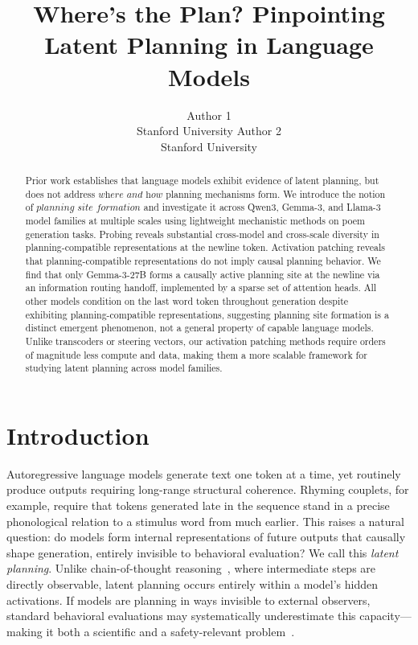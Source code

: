 \documentclass{article}
\title{Where's the Plan? Pinpointing Latent Planning in Language Models}
\author{Author 1 \\ Stanford University \And Author 2 \\ Stanford University}
\begin{document}
\ifcolmsubmission
\linenumbers
\fi

\maketitle

\begin{abstract}
    Prior work establishes that language models exhibit evidence of latent planning, but does not address $\textit{where and how}$ planning mechanisms form. We introduce the notion of $\textit{planning site formation}$ and investigate it across Qwen3, Gemma-3, and Llama-3 model families at multiple scales using lightweight mechanistic methods on poem generation tasks. Probing reveals substantial cross-model and cross-scale diversity in planning-compatible representations at the newline token. Activation patching reveals that planning-compatible representations do not imply causal planning behavior. We find that only Gemma-3-27B forms a causally active planning site at the newline via an information routing handoff, implemented by a sparse set of attention heads. All other models condition on the last word token throughout generation despite exhibiting planning-compatible representations, suggesting planning site formation is a distinct emergent phenomenon, not a general property of capable language models. Unlike transcoders or steering vectors, our activation patching methods require orders of magnitude less compute and data, making them a more scalable framework for studying latent planning across model families.
\end{abstract}


\section{Introduction}

Autoregressive language models generate text one token at a time, yet routinely produce outputs requiring long-range structural coherence. Rhyming couplets, for example, require that tokens generated late in the sequence stand in a precise phonological relation to a stimulus word from much earlier. This raises a natural question: do models form internal representations of future outputs that causally shape generation, entirely invisible to behavioral evaluation? We call this \textit{latent planning}. Unlike chain-of-thought reasoning~\citep{wei2022chain}, where intermediate steps are directly observable, latent planning occurs entirely within a model's hidden activations. If models are planning in ways invisible to external observers, standard behavioral evaluations may systematically underestimate this capacity---making it both a scientific and a safety-relevant problem~\citep{pfau2024dots,hao2024coconut}.
\end{document}
